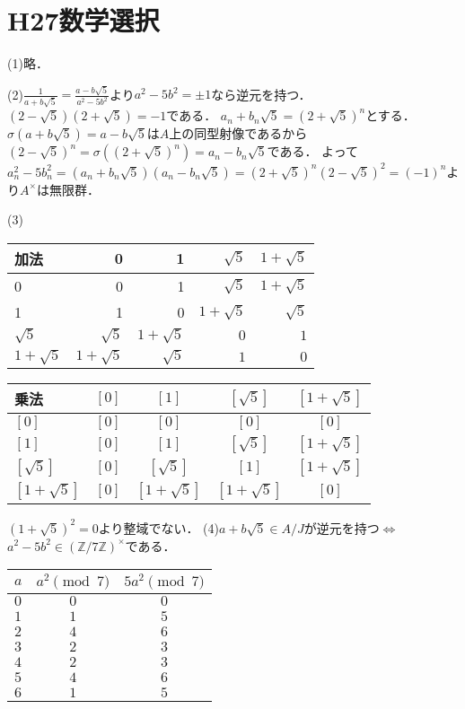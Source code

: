\documentclass[
		book,
		head_space=20mm,
		foot_space=20mm,
		gutter=10mm,
		line_length=190mm
]{jlreq}
\begin{document}
\section{H27数学選択}
(1)略．

(2)$\frac{1}{a+b\sqrt{5}}=\frac{a-b\sqrt{5}}{a^2-5b^2}$より$a^2-5b^2=\pm{1}$なら逆元を持つ．
$(2-\sqrt{5})(2+\sqrt{5})=-1$である．
$a_n+b_n\sqrt{5}=(2+\sqrt{5})^n$とする．$\sigma(a+b\sqrt{5})=a-b\sqrt{5}$は$A$上の同型射像であるから$(2-\sqrt{5})^n=\sigma((2+\sqrt{5})^n)=a_n-b_n\sqrt{5}$である．
よって$a_n^2-5b_n^2=(a_n+b_n\sqrt{5})(a_n-b_n\sqrt{5})=(2+\sqrt{5})^n(2-\sqrt{5})^2=(-1)^n$より$A^\times$は無限群．

(3)
\begin{tabular}{l|rrrr} \hline
    加法 & 0 & 1 & $\sqrt{5}$ & $1+\sqrt{5}$\\ \hline
    0    & 0 & 1 & $\sqrt{5}$ & $1+\sqrt{5}$\\ 
    1    & 1 & 0 & $1+\sqrt{5}$ & $\sqrt{5}$\\ 
    $\sqrt{5}$ &$\sqrt{5}$ & $1+\sqrt{5}$ & $0$ & $1$\\
    $1+\sqrt{5}$ &$1+\sqrt{5}$ & $\sqrt{5}$ & $1$ & $0$\\ \hline
 \end{tabular}
 \begin{tabular}{l|cccc}
    \hline
    乗法 & $[0]$ & $[1]$ & $[\sqrt{5}]$ & $[1+\sqrt{5}]$ \\
    \hline
    $[0]$ & $[0]$ & $[0]$ & $[0]$ & $[0]$ \\
    $[1]$ & $[0]$ & $[1]$ & $[\sqrt{5}]$ & $[1+\sqrt{5}]$ \\
    $[\sqrt{5}]$ & $[0]$ & $[\sqrt{5}]$ & $ [1]$ & $ [1+\sqrt{5}]$ \\
    $[1+\sqrt{5}]$ & $[0]$ & $[1+\sqrt{5}]$ & $ [1+\sqrt{5}]$ & $[0]$ \\
    \hline
    \end{tabular}
$(1+\sqrt{5})^2=0$より整域でない．
(4)$a+b\sqrt{5}\in A/J$が逆元を持つ$\Leftrightarrow$ $a^2-5b^2\in   (\mathbb{Z}/7 \mathbb{Z})^\times $である．

\begin{tabular}{l|cc}
    \hline
     $a$ & $a^2 \pmod{7}$ & $5a^2 \pmod{7}$ \\
    \hline
    $0$ & $0$ & $0$ \\
    $1$ & $1$ & $5$ \\
    $2$ & $4$ & $6$ \\
    $3$ & $2$ & $3$ \\
    $4$ & $2$ & $3$ \\
    $5$ & $4$ & $6$ \\
    $6$ & $1$ & $5$ \\
    \hline
\end{tabular}
\end{document}
